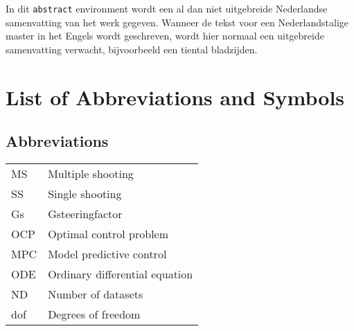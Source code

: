 \documentclass[master=elt,masteroption=eg,english]{kulemt}
\begin{document}
\begin{abstract*}
  In dit \texttt{abstract} environment wordt een al dan niet uitgebreide
  Nederlandse samenvatting van het werk gegeven.
  Wanneer de tekst voor een Nederlandstalige master in het Engels wordt
  geschreven, wordt hier normaal een uitgebreide samenvatting verwacht,
  bijvoorbeeld een tiental bladzijden. 

  \lipsum[1]
\end{abstract*}

\listoffiguresandtables
\chapter{List of Abbreviations and Symbols}
\section*{Abbreviations}
\begin{flushleft}
  \renewcommand{\arraystretch}{1.1}
  \begin{tabularx}{\textwidth}{@{}p{12mm}X@{}}
    MS   & Multiple shooting  \\
    SS   & Single shooting  \\
    Gs   & Gsteeringfactor  \\
    OCP  & Optimal control problem\\
    MPC  & Model predictive control\\
    ODE  & Ordinary differential equation\\
    ND	 & Number of datasets\\
    dof  & Degrees of freedom
  \end{tabularx}
\end{flushleft}
\end{document}
